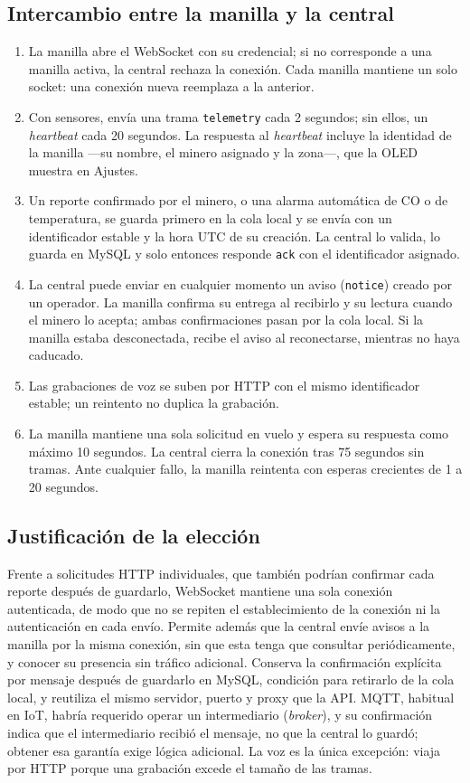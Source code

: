 \documentclass[10pt,a4paper]{article}
\newcommand{\code}[1]{{\small\urlstyle{tt}\nolinkurl{#1}}}
\begin{document}
\subsection{Intercambio entre la manilla y la central}
\label{sec:intercambio}
\begin{enumerate}
\item La manilla abre el WebSocket con su credencial; si no corresponde a una manilla activa, la central rechaza la conexión. Cada manilla mantiene un solo socket: una conexión nueva reemplaza a la anterior.
\item Con sensores, envía una trama \code{telemetry} cada 2 segundos; sin ellos, un \emph{heartbeat} cada 20 segundos. La respuesta al \emph{heartbeat} incluye la identidad de la manilla —su nombre, el minero asignado y la zona—, que la OLED muestra en Ajustes.
\item Un reporte confirmado por el minero, o una alarma automática de CO o de temperatura, se guarda primero en la cola local y se envía con un identificador estable y la hora UTC de su creación. La central lo valida, lo guarda en MySQL y solo entonces responde \code{ack} con el identificador asignado.
\item La central puede enviar en cualquier momento un aviso (\code{notice}) creado por un operador. La manilla confirma su entrega al recibirlo y su lectura cuando el minero lo acepta; ambas confirmaciones pasan por la cola local. Si la manilla estaba desconectada, recibe el aviso al reconectarse, mientras no haya caducado.
\item Las grabaciones de voz se suben por HTTP con el mismo identificador estable; un reintento no duplica la grabación.
\item La manilla mantiene una sola solicitud en vuelo y espera su respuesta como máximo 10 segundos. La central cierra la conexión tras 75 segundos sin tramas. Ante cualquier fallo, la manilla reintenta con esperas crecientes de 1 a 20 segundos.
\end{enumerate}

\subsection{Justificación de la elección}
Frente a solicitudes HTTP individuales, que también podrían confirmar cada reporte después de guardarlo, WebSocket mantiene una sola conexión autenticada, de modo que no se repiten el establecimiento de la conexión ni la autenticación en cada envío. Permite además que la central envíe avisos a la manilla por la misma conexión, sin que esta tenga que consultar periódicamente, y conocer su presencia sin tráfico adicional. Conserva la confirmación explícita por mensaje después de guardarlo en MySQL, condición para retirarlo de la cola local, y reutiliza el mismo servidor, puerto y proxy que la API. MQTT, habitual en IoT, habría requerido operar un intermediario (\emph{broker}), y su confirmación indica que el intermediario recibió el mensaje, no que la central lo guardó; obtener esa garantía exige lógica adicional. La voz es la única excepción: viaja por HTTP porque una grabación excede el tamaño de las tramas.
\end{document}
